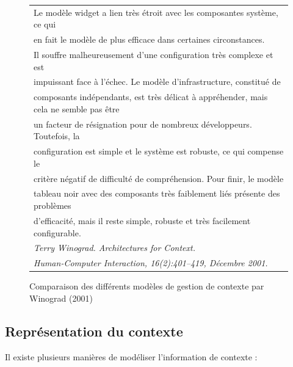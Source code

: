 \begin{figure}[H]
    \centering
    \begin{tabular}{l}
        Le modèle widget a lien très étroit avec les composantes système, ce qui
        \\ en fait le modèle de plus efficace dans certaines circonstances. \\
        Il souffre malheureusement d'une configuration très complexe et est \\
        impuissant face à l'échec. Le modèle d'infrastructure, constitué de \\
        composants indépendants, est très délicat à appréhender, mais cela ne
        semble pas être \\ un facteur de résignation pour de nombreux
        développeurs. Toutefois, la \\ configuration est simple et le système
        est robuste, ce qui compense le \\ critère négatif de difficulté de
        compréhension. Pour finir, le modèle \\ tableau noir avec des composants
        très faiblement liés présente des problèmes \\ d'efficacité, mais il
        reste simple, robuste et très facilement configurable.
        \cite{winograd_architectures_2001} \\
        \em \footnotesize Terry Winograd. Architectures for Context. \\
        \em \footnotesize Human-Computer Interaction, 16(2):401–419,
        Décembre 2001. \\
    \end{tabular}
    \caption{Comparaison des différents modèles de gestion de contexte par
    Winograd (2001)}
    \label{fig:quote}
\end{figure}

\subsection{Représentation du contexte}

Il existe plusieurs manières de modéliser l'information de contexte :

